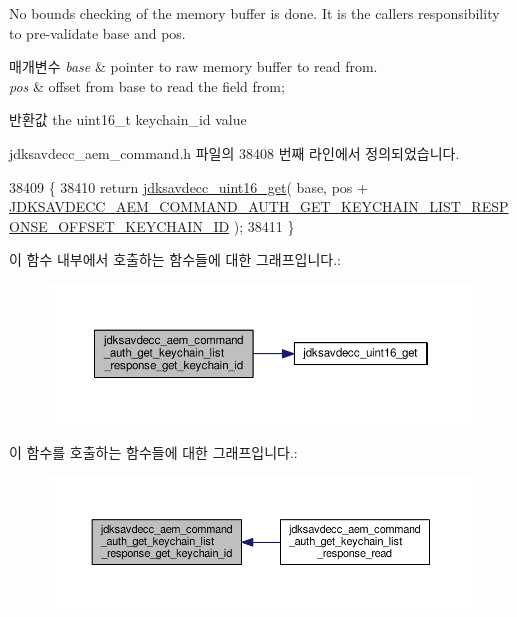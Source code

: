 No bounds checking of the memory buffer is done. It is the caller\textquotesingle{}s responsibility to pre-\/validate base and pos.


\begin{DoxyParams}{매개변수}
{\em base} & pointer to raw memory buffer to read from. \\
\hline
{\em pos} & offset from base to read the field from; \\
\hline
\end{DoxyParams}
\begin{DoxyReturn}{반환값}
the uint16\+\_\+t keychain\+\_\+id value 
\end{DoxyReturn}


jdksavdecc\+\_\+aem\+\_\+command.\+h 파일의 38408 번째 라인에서 정의되었습니다.


\begin{DoxyCode}
38409 \{
38410     \textcolor{keywordflow}{return} \hyperlink{group__endian_ga3fbbbc20be954aa61e039872965b0dc9}{jdksavdecc\_uint16\_get}( base, pos + 
      \hyperlink{group__command__auth__get__keychain__list__response_ga6e6d2e68496292ac993331f5b02c34fe}{JDKSAVDECC\_AEM\_COMMAND\_AUTH\_GET\_KEYCHAIN\_LIST\_RESPONSE\_OFFSET\_KEYCHAIN\_ID}
       );
38411 \}
\end{DoxyCode}


이 함수 내부에서 호출하는 함수들에 대한 그래프입니다.\+:
\nopagebreak
\begin{figure}[H]
\begin{center}
\leavevmode
\includegraphics[width=350pt]{group__command__auth__get__keychain__list__response_gae1500e4f77cb98f34426d4d84130412d_cgraph}
\end{center}
\end{figure}




이 함수를 호출하는 함수들에 대한 그래프입니다.\+:
\nopagebreak
\begin{figure}[H]
\begin{center}
\leavevmode
\includegraphics[width=350pt]{group__command__auth__get__keychain__list__response_gae1500e4f77cb98f34426d4d84130412d_icgraph}
\end{center}
\end{figure}


